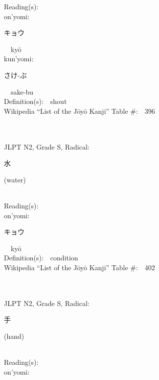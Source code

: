 \begin{multicols}{2}
Reading(s):\ \ \\
{\hspace*{1em}}on'yomi:\ \ \\
{\hspace*{2em}}{\begin{CJK}{UTF8}{min} キョウ \end{CJK}}\ \ ky\=o\ \ \\
{\hspace*{1em}}kun'yomi:\ \ \\
{\hspace*{2em}}{\begin{CJK}{UTF8}{min} さけ-ぶ \end{CJK}}\ \ sake-bu\ \ \\
Definition(s):\ \ shout \\
Wikipedia ``List of the J\=oy\=o Kanji'' Table \#:\ \ 396 \\
\ \ \\
{\fontsize{34pt}{40pt}  }\ \ \\  %
{JLPT N2, Grade S, Radical:\ \ {\begin{CJK}{UTF8}{min} 水 \end{CJK}} (water) } \\
Reading(s):\ \ \\
{\hspace*{1em}}on'yomi:\ \ \\
{\hspace*{2em}}{\begin{CJK}{UTF8}{min} キョウ \end{CJK}}\ \ ky\=o\ \ \\
Definition(s):\ \ condition \\
Wikipedia ``List of the J\=oy\=o Kanji'' Table \#:\ \ 402 \\
\ \ \\
{\fontsize{34pt}{40pt}  }\ \ \\  %
{JLPT N2, Grade S, Radical:\ \ {\begin{CJK}{UTF8}{min} 手 \end{CJK}} (hand) } \\
Reading(s):\ \ \\
{\hspace*{1em}}on'yomi:\ \ \\

\end{multicols}

